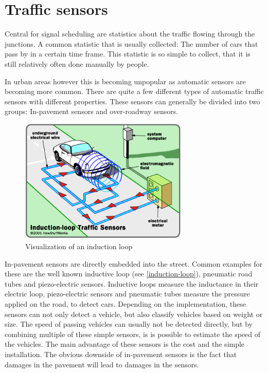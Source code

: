 \section{Traffic sensors}

Central for signal scheduling are statistics about the traffic flowing through the junctions. A common statistic that is usually collected: The number of cars that pass by in a certain time frame. This statistic is so simple to collect, that it is still relatively often done manually by people.

In urban areas however this is becoming unpopular as automatic sensors are becoming more common. There are quite a few different types of automatic traffic sensors with different properties. These sensors can generally be divided into two groups: In-pavement sensors and over-roadway sensors.

\begin{figure}[ht]
	\centering
	\includegraphics[width=8cm]{figures/induction-loop}
	\caption{Visualization of an induction loop}
	\label{induction-loop}
\end{figure}

In-pavement sensors are directly embedded into the street. Common examples for these are the well known inductive loop (see \autoref{induction-loop}), pneumatic road tubes and piezo-electric sensors. Inductive loops measure the inductance in their electric loop, piezo-electric sensors and pneumatic tubes measure the pressure applied on the road, to detect cars. Depending on the implementation, these sensors can not only detect a vehicle, but also classify vehicles based on weight or size. The speed of passing vehicles can usually not be detected directly, but by combining multiple of these simple sensors, is is possible to estimate the speed of the vehicles.
The main advantage of these sensors is the cost and the simple installation. The obvious downside of in-pavement sensors is the fact that damages in the pavement will lead to damages in the sensors.

